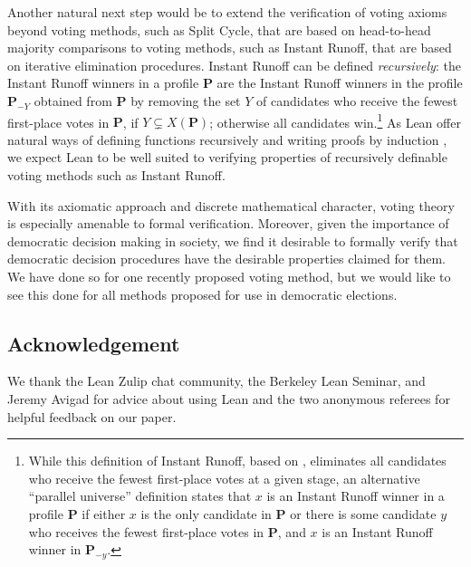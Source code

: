 \documentclass[runningheads]{llncs}
\begin{document}
Another natural next step would be to extend the verification of voting axioms beyond voting methods, such as Split Cycle, that are based on head-to-head majority comparisons to voting methods, such as Instant Runoff, that are based on iterative elimination procedures. Instant Runoff can be defined \textit{recursively}: the Instant Runoff winners in a profile $\mathbf{P}$ are the Instant Runoff winners in the profile $\mathbf{P}_{-Y}$ obtained from $\mathbf{P}$ by removing the set $Y$ of candidates who receive the fewest first-place votes in $\mathbf{P}$, if $Y\subsetneq X(\mathbf{P})$; otherwise all candidates win.\footnote{While this definition of Instant Runoff, based on \cite[p.~7]{Taylor2008}, eliminates all candidates who receive the fewest first-place votes at a given stage, an alternative ``parallel universe'' definition states that $x$ is an Instant Runoff winner in a profile $\mathbf{P}$ if either $x$ is the only candidate in $\mathbf{P}$ or there is some candidate $y$ who receives the fewest first-place votes in $\mathbf{P}$, and $x$ is an Instant Runoff winner in $\mathbf{P}_{-y}$.} As Lean offer natural ways of defining functions recursively and writing proofs by induction \cite[\S~8]{Avigad2021}, we expect Lean to be well suited to verifying properties of recursively definable voting methods such as Instant Runoff.


With its axiomatic approach and discrete mathematical character, voting theory is especially amenable to formal verification. Moreover, given the importance of democratic decision making in society, we find it desirable to formally verify that democratic decision procedures have the desirable properties claimed for them. We have done so for one recently proposed voting method, but we would like to see this done for all methods proposed for use in democratic elections.


\subsection*{Acknowledgement}

We thank the Lean Zulip chat community, the Berkeley Lean Seminar, and Jeremy Avigad for advice about using Lean and the two anonymous referees for helpful feedback on our paper.

%
%
%
 
 
%
\end{document}

